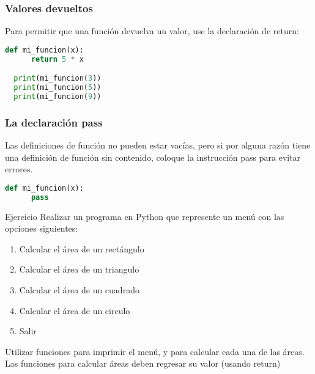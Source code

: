 \begin{frame}[fragile]
  \frametitle{Valores devueltos}

  Para permitir que una función devuelva un valor,
  use la declaración de \textcolor{codeKeyword}{return}:

  \vspace{\baselineskip}
  \begin{lstlisting}[language=Python]
  def mi_funcion(x):
      return 5 * x

  print(mi_funcion(3))
  print(mi_funcion(5))
  print(mi_funcion(9))
  \end{lstlisting}
\end{frame}

\begin{frame}[fragile]
  \frametitle{La declaración \textbf{pass}}

  Las definiciones de función no pueden estar vacías, pero si
  por alguna razón tiene una definición de función sin contenido,
  coloque la instrucción \textcolor{codeKeyword}{pass} para
  evitar errores. 

  \vspace{\baselineskip}
  \begin{lstlisting}[language=Python]
  def mi_funcion(x):
      pass
  \end{lstlisting}
\end{frame}

\begin{frame}[c]{Ejercicio}
  \vspace{\baselineskip}
  Realizar un programa en Python que represente un menú con las opciones
  siguientes:

  \vspace{\baselineskip}
  \begin{enumerate}
    \item Calcular el área de un rectángulo
    \item Calcular el área de un triangulo
    \item Calcular el área de un cuadrado
    \item Calcular el área de un circulo
    \item Salir
  \end{enumerate}


  \vspace{\baselineskip}
  Utilizar funciones para imprimir el menú, y para calcular cada una de las
  áreas. Las funciones para calcular áreas deben regresar su valor (usando
  return)
\end{frame}
